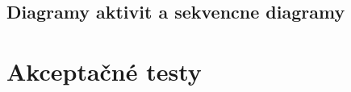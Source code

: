 \documentclass[12pt]{report}
\begin{document}
\section{Diagramy aktivit a sekvencne diagramy}

\clearpage 


\clearpage 


\clearpage 



\chapter{Akceptačné testy}




\end{document}
